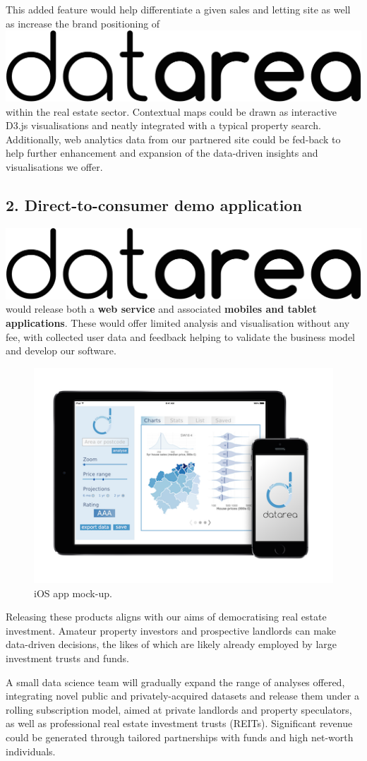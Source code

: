 \documentclass[
10pt, %
a4paper, %
oneside, %
headinclude,footinclude, %
BCOR5mm, %
]{scrartcl}
\newcommand*{\logo}{\includegraphics[scale=.04]{Figures/logotext.png}}
\begin{document}
This added feature would help differentiate a given sales and letting
site as well as increase the brand positioning of \logo\hspace{.1em}
within the real estate sector. Contextual maps could be drawn as
interactive D3.js visualisations and neatly integrated with a typical
property search. Additionally, web analytics data from our partnered
site could be fed-back to help further enhancement and expansion of
the data-driven insights and visualisations we offer.


\subsection*{2. Direct-to-consumer demo application}
\logo \hspace{.1em} would release both a {\bf web service} and associated
{\bf mobiles and tablet applications}. These would offer limited analysis and
visualisation without any fee, with collected user data and feedback helping to
validate the business model and develop our software.

\begin{figure}
\centering
\includegraphics[width=.39\textwidth]{Figures/mockup.png}
\caption{ iOS app mock-up.}
\end{figure}

Releasing these products aligns with our aims of democratising real
estate investment. Amateur property investors and prospective
landlords can make data-driven decisions, the likes of which are likely
already employed by large investment trusts and funds. 

A small data science team will gradually expand the range of analyses
offered, integrating novel public and privately-acquired datasets and
release them under a rolling subscription model, aimed at private
landlords and property speculators, as well as professional real
estate investment trusts (REITs). Significant revenue could be
generated through tailored partnerships with funds and high net-worth
individuals.
\end{document}
